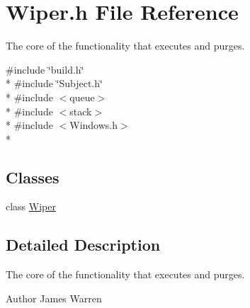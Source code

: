 \section{Wiper.\-h File Reference}
\label{_wiper_8h}


The core of the functionality that executes and purges.  


{\ttfamily \#include \char`\"{}build.\-h\char`\"{}}\\*
{\ttfamily \#include \char`\"{}Subject.\-h\char`\"{}}\\*
{\ttfamily \#include $<$queue$>$}\\*
{\ttfamily \#include $<$stack$>$}\\*
{\ttfamily \#include $<$Windows.\-h$>$}\\*
\subsection*{Classes}
\begin{DoxyCompactItemize}
\item 
class \hyperlink{class_wiper}{Wiper}
\end{DoxyCompactItemize}


\subsection{Detailed Description}
The core of the functionality that executes and purges. \begin{DoxyAuthor}{Author}
James Warren 
\end{DoxyAuthor}

